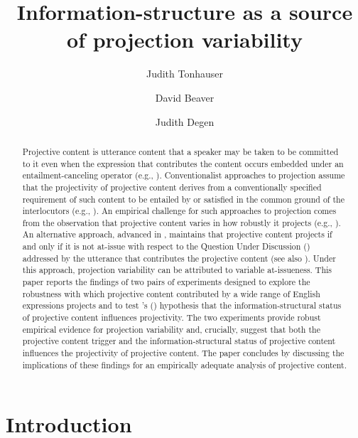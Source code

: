 \documentclass[11pt,fleqn]{article}
\title{Information-structure as a source of projection variability}
\author[$\bullet$]{Judith Tonhauser}
\author[$\circ$]{David Beaver}
\author[$\triangleright$]{Judith Degen}
\affil[$\bullet$]{The Ohio State University}
\affil[$\circ$]{University of Texas at Austin}
\affil[$\triangleright$]{Stanford University}
\newcommand{\6}{\mbox{$[\hspace*{-.6mm}[$}}
\newcommand{\9}{\mbox{$]\hspace*{-.6mm}]$}}
\newcommand{\citetpos}[1]{\citeauthor{#1}'s (\citeyear{#1})}
\begin{document}
\maketitle

\begin{abstract}
Projective content is utterance content that a speaker may be taken to be committed to it even when the expression that contributes the content occurs embedded under an entailment-canceling operator (e.g., \citealt{ccmg90}). Conventionalist approaches to projection assume that the projectivity of projective content derives from a conventionally specified requirement of such content to be entailed by or satisfied in the common ground of the interlocutors (e.g., \citealt{heim83,vds92}). An empirical challenge for such approaches to projection comes from the observation that projective content varies in how robustly it projects (e.g., \citealt{karttunen71b,simons01,abusch10}). An alternative approach, advanced in \citealt{brst-salt10}, maintains that projective content projects if and only if it is not at-issue with respect to the Question Under Discussion (\citealt{roberts12}) addressed by the utterance that contributes the projective content (see also \citealt{brst-ar}). Under this approach, projection variability can be attributed to variable at-issueness. This paper reports the findings of two pairs of experiments designed to explore the robustness with which projective content contributed by a wide range of English expressions projects and to test \citetpos{brst-salt10} hypothesis that the information-structural status of projective content influences projectivity. The two experiments provide robust empirical evidence for projection variability and, crucially, suggest that both the projective content trigger and the information-structural status of projective content influences the projectivity of projective content. The paper concludes by discussing the implications of these findings for an empirically adequate analysis of projective content.

\end{abstract}


			
\section{Introduction}\label{s1}
\end{document}
